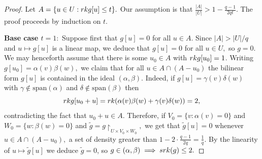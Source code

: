 \documentclass{daj}
\newcommand{\rk}{\textnormal{rk}}
\newcommand{\srk}{\textnormal{srk}}
\begin{document}
    \begin{proof}
         Let $A = \{u\in U: \rk g[u] \le t \}.$ Our assumption is that $\frac{|A|}{|U|} > 1-\frac{q-1}{2qt}.$ The proof proceeds by induction on $t.$
         
         \textbf{Base case $t=1:$} Suppose first that $g[u] = 0$ for all $u\in A.$ Since $|A| > |U|/q$ and $u\mapsto g[u]$ is a linear map, we deduce that $g[u] = 0$ for all $u\in U,$ so $g = 0.$  We may henceforth assume that there is some $u_0\in A$ with $\rk g[u_0] = 1$. Writing $g[u_0] = \alpha(v)\beta(w),$ we claim that for all $u\in A\cap (A-u_0)$ the bilinear form $g[u]$ is contained in the ideal $(\alpha,\beta).$  Indeed, if $g[u] = \gamma(v)\delta(w)$ with $\gamma \not\in \text{span}(\alpha)$ and $\delta\not\in\text{span}(\beta)$ then 
         \[
         \rk g[u_0+u] = \rk(\alpha(v)\beta(w)+\gamma(v)\delta(w)) = 2,
         \]
         contradicting the fact that $u_0+u \in A.$ Therefore, if $V_0 = \{v: \alpha(v) = 0\}$ and $W_0 = \{w: \beta(w) = 0\}$ and $\tilde g = g\restriction_{U\times V_0\times W_0},$ we get that $\tilde g[u] = 0$ whenever $u\in A\cap (A-u_0),$  a set of density greater than $ 1- 2\cdot \frac{q-1}{2q} = \frac{1}{q}.$ By the linearity of $u\mapsto \tilde g[u]$ we deduce $\tilde g = 0$, so $g\in(\alpha,\beta)\implies \srk(g) \le 2.$ 


\end{proof}
\end{document}
